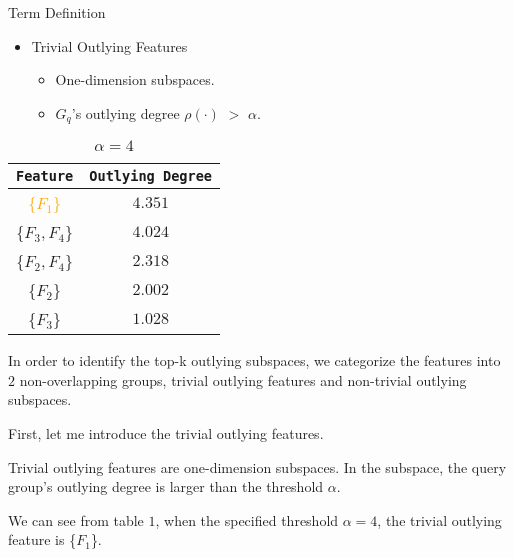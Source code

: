 \documentclass[
 size=14pt,
 paper=smartboard,  %
 mode=present, 		%
 display=slides, 	%
 style=tuliplab,  	%
 pauseslide,
 fleqn,leqno]{powerdot}
\begin{document}
\begin{slide}[toc=,bm=]{Term Definition}
\begin{itemize}
\item
Trivial Outlying Features

\begin{itemize}
\item
\smallskip
One-dimension subspaces.

\item
${G_q}$'s outlying degree $\rho(\cdot)$ $>$ $\alpha$.
\end{itemize}
\end{itemize}
\begin{table}
\setlength{\abovecaptionskip}{0pt}
\setlength{\belowcaptionskip}{10pt}
\centering
\caption{$\alpha = 4$}

\begin{tabular}{  c  |  c }
\toprule
\centering
\texttt{Feature}  & \texttt{Outlying Degree}  \\
\midrule
 {\textcolor{orange}{\{$F_1$\}}} & $4.351$ \\
 {\{$F_3, F_4$\}}                & $4.024$ \\
 {\{$F_2, F_4$\}}                & $2.318$ \\
 {\{$F_2$\}}                     & $2.002$ \\
 {\{$F_3$\}}                     & $1.028$ \\
\bottomrule
\end{tabular}
\end{table}

\begin{note}
In order to identify the top-k outlying subspaces,
we categorize the features into $2$ non-overlapping groups,
trivial outlying features and non-trivial outlying subspaces.

First, let me introduce the trivial outlying features.

Trivial outlying features are one-dimension subspaces.
In the subspace,
the query group's outlying degree is larger than the threshold $\alpha$.

We can see from table $1$,
when the specified threshold $\alpha = 4$,
the trivial outlying feature is \{$F_1$\}.
\end{note}

\end{slide}
\end{document}
